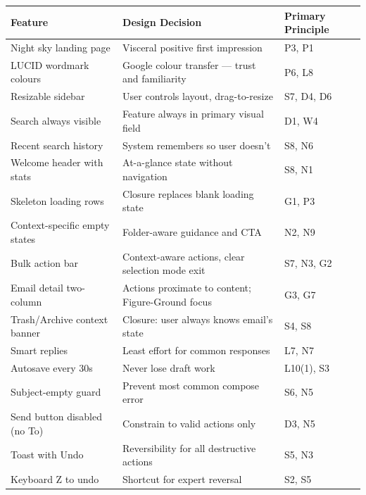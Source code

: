 \documentclass[12pt,a4paper]{report}
\begin{document}
{{\begin{table}[H]
\centering
\small
\begin{tabularx}{\textwidth}{lXl}
  \toprule
  \textbf{Feature} & \textbf{Design Decision} & \textbf{Primary Principle}\\
  \midrule
  Night sky landing page       & Visceral positive first impression                  & P3, P1\\
  LUCID wordmark colours       & Google colour transfer — trust and familiarity       & P6, L8\\
  Resizable sidebar            & User controls layout, drag-to-resize                & S7, D4, D6\\
  Search always visible        & Feature always in primary visual field               & D1, W4\\
  Recent search history        & System remembers so user doesn't                    & S8, N6\\
  Welcome header with stats    & At-a-glance state without navigation                & S8, N1\\
  Skeleton loading rows        & Closure replaces blank loading state                & G1, P3\\
  Context-specific empty states & Folder-aware guidance and CTA                      & N2, N9\\
  Bulk action bar              & Context-aware actions, clear selection mode exit    & S7, N3, G2\\
  Email detail two-column      & Actions proximate to content; Figure-Ground focus   & G3, G7\\
  Trash/Archive context banner & Closure: user always knows email's state            & S4, S8\\
  Smart replies                & Least effort for common responses                   & L7, N7\\
  Autosave every 30s           & Never lose draft work                               & L10(1), S3\\
  Subject-empty guard          & Prevent most common compose error                   & S6, N5\\
  Send button disabled (no To) & Constrain to valid actions only                     & D3, N5\\
  Toast with Undo              & Reversibility for all destructive actions            & S5, N3\\
  Keyboard Z to undo           & Shortcut for expert reversal                        & S2, S5\\

\end{tabularx}
\end{table}}}
\end{document}

